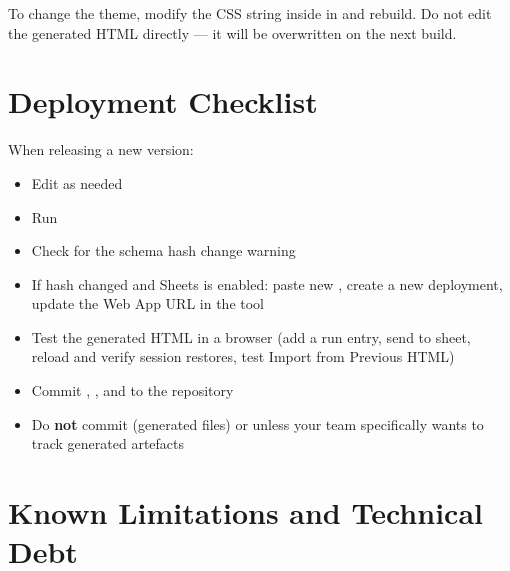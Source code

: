 To change the theme, modify the CSS string inside  in
 and rebuild. Do not edit the generated HTML directly --- it
will be overwritten on the next build.

\chapter{Deployment Checklist}

When releasing a new version:

\begin{itemize}
    \item[$\square$] Edit  as needed
    \item[$\square$] Run 
    \item[$\square$] Check for the schema hash change warning
    \item[$\square$] If hash changed and Sheets is enabled: paste new
          , create a new deployment, update the Web
          App URL in the tool
    \item[$\square$] Test the generated HTML in a browser (add a run entry,
          send to sheet, reload and verify session restores, test Import from
          Previous HTML)
    \item[$\square$] Commit , , and
           to the repository
    \item[$\square$] Do \textbf{not} commit  (generated files)
          or  unless your team specifically wants to track
          generated artefacts
\end{itemize}

\chapter{Known Limitations and Technical Debt}
\label{ch:limitations}

